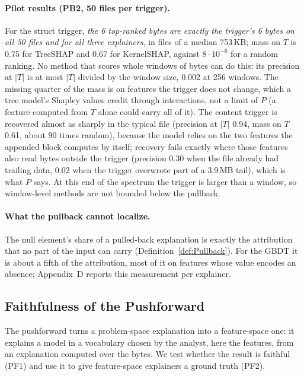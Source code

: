 \paragraph{Pilot results (PB2, 50 files per trigger).} For the struct trigger, \textit{the 6 top-ranked bytes are exactly the trigger's 6 bytes on all 50 files and for all three explainers}, in files of a median 753\,KB; mass on $T$ is 0.75 for TreeSHAP and 0.67 for KernelSHAP, against $8 \cdot 10^{-6}$ for a random ranking. No method that scores whole windows of bytes can do this: its precision at $|T|$ is at most $|T|$ divided by the window size, 0.002 at 256 windows. The missing quarter of the mass is on features the trigger does not change, which a tree model's Shapley values credit through interactions, not a limit of $P$ (a feature computed from $T$ alone could carry all of it). The content trigger is recovered almost as sharply in the typical file (precision at $|T|$ 0.94, mass on $T$ 0.61, about 90 times random), because the model relies on the two features the appended block computes by itself; recovery fails exactly where those features also read bytes outside the trigger (precision 0.30 when the file already had trailing data, 0.02 when the trigger overwrote part of a 3.9\,MB tail), which is what $P$ says. At this end of the spectrum the trigger is larger than a window, so window-level methods are not bounded below the pullback.

\paragraph{What the pullback cannot localize.} The null element's share of a pulled-back explanation is exactly the attribution that no part of the input can carry (Definition~\ref{def:Pullback}). For the GBDT it is about a fifth of the attribution, most of it on features whose value encodes an absence; Appendix~D reports this measurement per explainer.

\subsection{Faithfulness of the Pushforward}
\label{sec:XML:Pushforward}

The pushforward turns a problem-space explanation into a feature-space one: it explains a model in a vocabulary chosen by the analyst, here the features, from an explanation computed over the bytes. We test whether the result is faithful (PF1) and use it to give feature-space explainers a ground truth (PF2).

